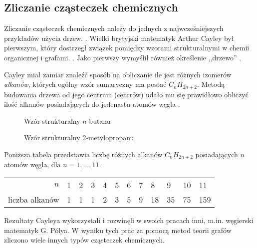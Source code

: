 \subsection*{Zliczanie cząsteczek chemicznych}

Zliczanie cząsteczek chemicznych należy do jednych z najwcześniejszych przykładów użycia drzew. \cite[76]{wilson}. Wielki brytyjski matematyk Arthur Cayley był pierwszym, który dostrzegł związek pomiędzy wzorami strukturalnymi w chemii organicznej i grafami. \cite[59]{gutman}. Jako pierwszy wymyślił również określenie ,,drzewo'' \cite[60]{gutman}.

Cayley miał zamiar znaleźć sposób na obliczanie ile jest różnych izomerów \emph{alkanów}, których ogólny wzór sumaryczny ma postać $C_nH_{2n+2}$. Metodą budowania drzewa od jego centrum (centrów) udało mu się prawidłowo obliczyć ilość alkanów posiadających do jedenastu atomów węgla \cite[180]{aldous}. 

\begin{figure}[H]
\centering
\begin{minipage}[b]{.45\textwidth}
  \centering
{}
\captionsetup{justification=centering}
\caption{Wzór strukturalny $n$-butanu}
\label{fig:n-butane}
\end{minipage}
\begin{minipage}[b]{.45\textwidth}
  \centering
{}
\captionsetup{justification=centering}
\caption{Wzór strukturalny 2-metylopropanu}
\end{minipage}
\end{figure}

Poniższa tabela przedstawia liczbę różnych alkanów $C_nH_{2n+2}$ posiadających $n$ atomów węgla, dla $n=1,\ldots,11$.

\begin{table}[H]
\begin{tabularx}{\textwidth}{rXXXXXXXXXXX}
\toprule
  $n$ & 1 & 2 & 3 & 4 & 5 & 6 & 7 & 8 & 9 & 10 & 11 \\ 
 liczba alkanów & 1 & 1 & 1 & 2 & 3 & 5 & 9 & 18 & 35 & 75 & 159 \\
 \bottomrule
\end{tabularx}
\end{table}

Rezultaty Cayleya wykorzystali i rozwinęli w swoich pracach inni, m.in. węgierski matematyk G. Pólya. W wyniku tych prac za pomocą metod teorii grafów zliczono wiele innych typów cząsteczek chemicznych.


